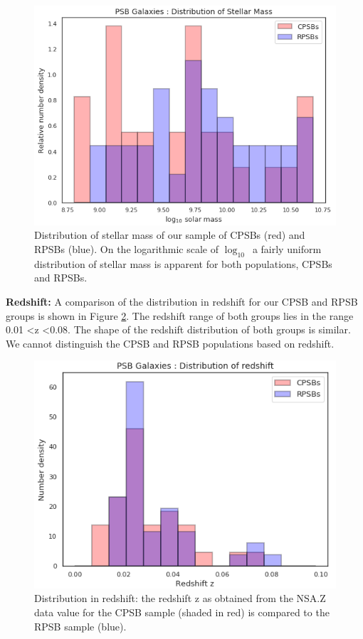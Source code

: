 \begin{figure}
    \centering
    \includegraphics[width=\columnwidth]{images/JupyterPlots/Dist-Stellar-Mass-All.png}
    \caption[Distribution of stellar mass for CPSBs and RPSBs]{Distribution of stellar mass of our sample of CPSBs (red) and RPSBs (blue). On the logarithmic scale of $\log_{10}$\Msun\ a fairly uniform distribution of stellar mass is apparent for both populations, CPSBs and RPSBs.}
    \label{fig:stellar-mass-plot}
\end{figure}

\textbf{Redshift:} A comparison of the distribution in redshift for our CPSB and RPSB groups is shown in Figure \ref{fig:redshift-plot}. The redshift range of both groups lies in the range 0.01 \textless z \textless 0.08. The shape of the redshift distribution of both groups is similar. We cannot distinguish the CPSB and RPSB populations based on redshift.

\begin{figure}
    \centering
    \includegraphics[width=\columnwidth]{images/JupyterPlots/Dist-z-All.png}
    \caption[PSB distribution in redshift]{Distribution in redshift: the redshift z as obtained from the NSA.Z data value for the CPSB sample (shaded in red) is compared to the RPSB sample (blue).}
    \label{fig:redshift-plot}
\end{figure}

